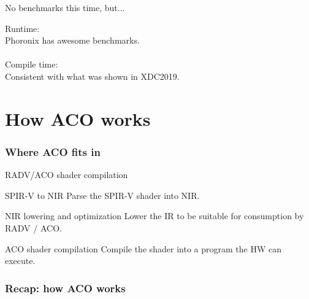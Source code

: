 \documentclass[aspectratio=169,t,xcolor=table]{beamer}
\begin{document}
\begin{frame}{No benchmarks this time, but...}

    \normalsize
    Runtime: \\
    \LARGE
    Phoronix has awesome benchmarks. \\
    \ \\
    \normalsize
    Compile time: \\
    \LARGE
    Consistent with what was shown in XDC2019.

\end{frame}

\section{How ACO works}

\begin{frame}{}
    \frametitle{Where ACO fits in}
\end{frame}

\begin{frame}{RADV/ACO shader compilation}

    \footnotesize

    \begin{alertblock}{SPIR-V to NIR}
        Parse the SPIR-V shader into NIR.
    \end{alertblock}

    \begin{alertblock}{NIR lowering and optimization}
        Lower the IR to be suitable for consumption by RADV / ACO.
    \end{alertblock}

    \begin{exampleblock}{ACO shader compilation}
        Compile the shader into a program the HW can execute.
    \end{exampleblock}

\end{frame}

\begin{frame}{}
    \frametitle{Recap: how ACO works}
\end{frame}
\end{document}
